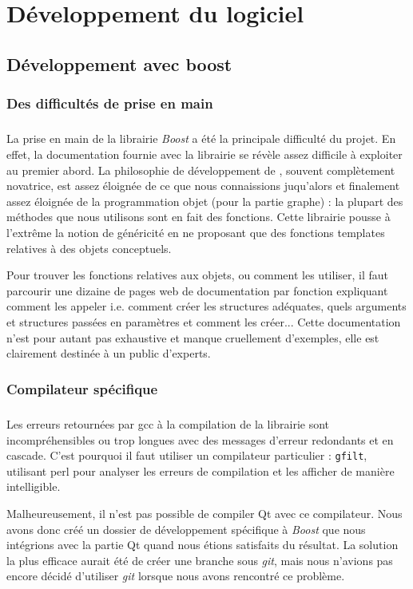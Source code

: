 \section{Développement du logiciel}
\subsection{Développement avec boost}
\subsubsection{Des difficultés de prise en main}
\subparagraph{}
La prise en main de la librairie \textit{Boost} a été la principale difficulté du projet. En effet, la documentation fournie avec la librairie se r\'ev\`ele assez difficile \`a exploiter au premier abord. La philosophie de développement de \boost, souvent compl\`etement novatrice, est assez éloignée de ce que nous connaissions juqu'alors et finalement assez éloignée de la programmation objet (pour la partie graphe) : la plupart des méthodes que nous utilisons sont en fait des fonctions. Cette librairie pousse \`a l'extr\^eme la notion de g\'en\'ericit\'e en ne proposant que des fonctions templates relatives \`a des objets conceptuels.

Pour trouver les fonctions relatives aux objets, ou comment les utiliser, il faut parcourir une dizaine de pages web de documentation par fonction expliquant comment les appeler i.e. comment créer les structures adéquates, quels arguments et structures passées en paramètres et comment les créer... Cette documentation n'est pour autant pas exhaustive et manque cruellement d'exemples, elle est clairement destinée à un public d'experts.

\subsubsection {Compilateur spécifique}
\subparagraph{}
Les erreurs retournées par gcc à la compilation de la librairie sont incompréhensibles ou trop longues avec des messages d'erreur redondants et en cascade. C'est pourquoi il faut utiliser un compilateur particulier : \verb|gfilt|, utilisant perl pour analyser les erreurs de compilation et les afficher de mani\`ere intelligible. 

Malheureusement, il n'est pas possible de compiler Qt avec ce compilateur. Nous avons donc créé un dossier de développement spécifique à \textit{Boost} que nous int\'egrions avec la partie Qt quand nous étions satisfaits du résultat. La solution la plus efficace aurait été de créer une branche sous \textit{git}, mais nous n'avions pas encore décidé d'utiliser \textit{git} lorsque nous avons rencontré ce problème.

